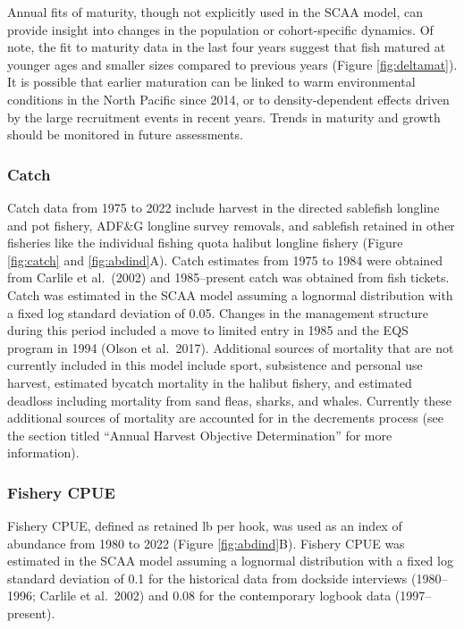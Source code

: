 \documentclass[
]{article}
\begin{document}
Annual fits of maturity, though not explicitly used in the SCAA model, can provide insight into changes in the population or cohort-specific dynamics. Of note, the fit to maturity data in the last four years suggest that fish matured at younger ages and smaller sizes compared to previous years (Figure \ref{fig:deltamat}). It is possible that earlier maturation can be linked to warm environmental conditions in the North Pacific since 2014, or to density-dependent effects driven by the large recruitment events in recent years. Trends in maturity and growth should be monitored in future assessments.

\hypertarget{catch}{%
\subsubsection{Catch}\label{catch}}

Catch data from 1975 to 2022 include harvest in the directed sablefish longline and pot fishery, ADF\&G longline survey removals, and sablefish retained in other fisheries like the individual fishing quota halibut longline fishery (Figure \ref{fig:catch} and \ref{fig:abdind}A). Catch estimates from 1975 to 1984 were obtained from Carlile et al.~(2002) and 1985--present catch was obtained from fish tickets. Catch was estimated in the SCAA model assuming a lognormal distribution with a fixed log standard deviation of 0.05. Changes in the management structure during this period included a move to limited entry in 1985 and the EQS program in 1994 (Olson et al.~2017). Additional sources of mortality that are not currently included in this model include sport, subsistence and personal use harvest, estimated bycatch mortality in the halibut fishery, and estimated deadloss including mortality from sand fleas, sharks, and whales. Currently these additional sources of mortality are accounted for in the decrements process (see the section titled ``Annual Harvest Objective Determination'' for more information).

\hypertarget{fishery-cpue}{%
\subsubsection{Fishery CPUE}\label{fishery-cpue}}

Fishery CPUE, defined as retained lb per hook, was used as an index of abundance from 1980 to 2022 (Figure \ref{fig:abdind}B). Fishery CPUE was estimated in the SCAA model assuming a lognormal distribution with a fixed log standard deviation of 0.1 for the historical data from dockside interviews (1980--1996; Carlile et al.~2002) and 0.08 for the contemporary logbook data (1997--present).
\end{document}
